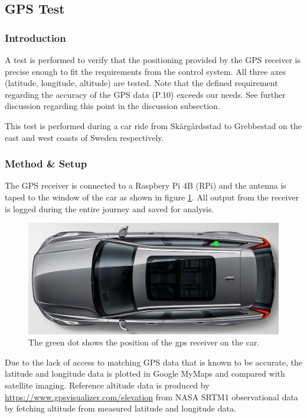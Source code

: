 \subsection{GPS Test}
\label{app:gps_test}
\subsubsection*{Introduction}
\vspace{-.3cm}
A test is performed to verify that the positioning provided by the GPS receiver is precise enough to fit the requirements from the control system. All three axes (latitude, longitude, altitude) are tested. Note that the defined requirement regarding the accuracy of the GPS data (P.10) exceeds our needs. See further discussion regarding this point in the discussion subsection. 

This test is performed during a car ride from Skärgårdsstad to Grebbestad on the east and west coasts of Sweden respectively.

\subsubsection*{Method \& Setup}
\vspace{-.3cm}
The GPS receiver is connected to a Raspbery Pi 4B (RPi) and the antenna is taped to the window of the car as shown in figure \ref{gps_pos}. All output from the receiver is logged during the entire journey and saved for analysis.

\begin{figure}[H]
	\includegraphics[width=\textwidth]{appendix/img/test-results/gps_pos.png}
	\caption{The green dot shows the position of the gps receiver on the car.}
	\label{gps_pos}
\end{figure}

Due to the lack of access to matching GPS data that is known to be accurate, the latitude and longitude data is plotted in Google MyMaps and compared with satellite imaging. Reference altitude data is produced by \url{https://www.gpsvisualizer.com/elevation} from NASA SRTM1 observational data by fetching altitude from measured latitude and longitude data.

